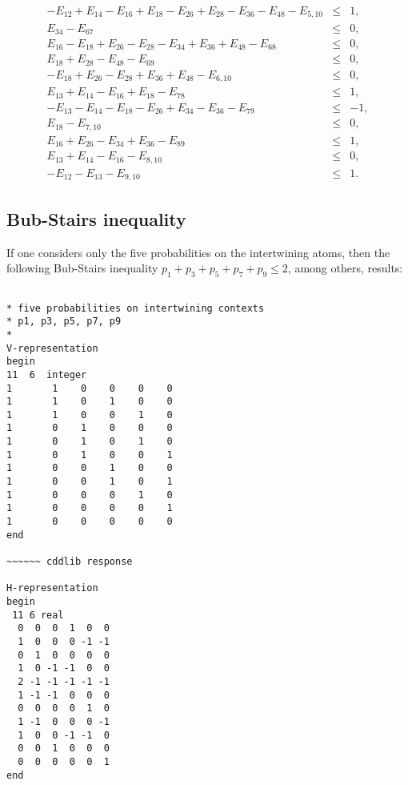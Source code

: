 \documentclass[%
  twocolumn,
 showpacs,
 showkeys,
 preprintnumbers,
 amsmath,amssymb,
 aps,
  pra,
  longbibliography,
 floatfix,
 ]{revtex4-1}
\begin{document}
\begin{eqnarray}
-E_{12} + E_{14} - E_{16} + E_{18} - E_{26} + E_{28} - E_{36} - E_{48} - E_{5,10} &\le&  1,                  \\
 E_{34} - E_{67} &\le&  0,                                                                                   \\
 E_{16} - E_{18} + E_{26} - E_{28} - E_{34} + E_{36} + E_{48} - E_{68} &\le&  0,                             \\
 E_{18} + E_{28} - E_{48} - E_{69} &\le&  0,                                                                 \\
-E_{18} + E_{26} - E_{28} + E_{36} + E_{48} - E_{6,10} &\le&  0,                                             \\
 E_{13} + E_{14} - E_{16} + E_{18} - E_{78} &\le&  1,                                                        \\
-E_{13} - E_{14} - E_{18} - E_{26} + E_{34} - E_{36} - E_{79} &\le&  -1,                                     \\
 E_{18} - E_{7,10} &\le&  0,                                                                                 \\
 E_{16} + E_{26} - E_{34} + E_{36} - E_{89} &\le&  1,                                                        \\
 E_{13} + E_{14} - E_{16} - E_{8,10} &\le&  0,                                                               \\
-E_{12} - E_{13} - E_{9,10} &\le&  1
.
\label{2017-b-kl-e-c}
\end{eqnarray}


\subsection{Bub-Stairs inequality}

If one considers only the five probabilities on the intertwining atoms,
then the following Bub-Stairs inequality  $p_1+p_3+p_5+p_7+p_9  \le  2$, among others,
results:

{ \begin{lstlisting}[backgroundcolor=\color{yellow!10},framerule=0pt,breaklines=true, frame=tb]

* five probabilities on intertwining contexts
* p1, p3, p5, p7, p9
*
V-representation
begin
11  6  integer
1       1    0    0    0    0
1       1    0    1    0    0
1       1    0    0    1    0
1       0    1    0    0    0
1       0    1    0    1    0
1       0    1    0    0    1
1       0    0    1    0    0
1       0    0    1    0    1
1       0    0    0    1    0
1       0    0    0    0    1
1       0    0    0    0    0
end

~~~~~~ cddlib response

H-representation
begin
 11 6 real
  0  0  0  1  0  0
  1  0  0  0 -1 -1
  0  1  0  0  0  0
  1  0 -1 -1  0  0
  2 -1 -1 -1 -1 -1
  1 -1 -1  0  0  0
  0  0  0  0  1  0
  1 -1  0  0  0 -1
  1  0  0 -1 -1  0
  0  0  1  0  0  0
  0  0  0  0  0  1
end

\end{lstlisting}  }
\end{document}
